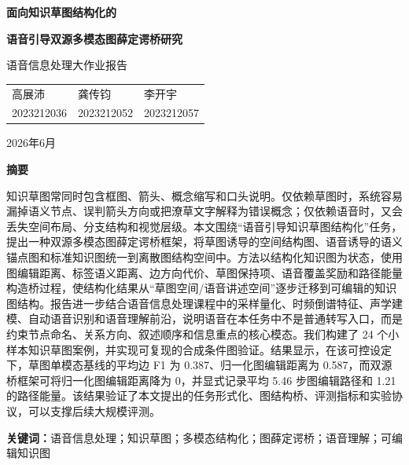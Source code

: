 \documentclass[UTF8,a4paper,12pt,fontset=fandol]{ctexart}
\begin{document}

\begin{titlepage}
  \centering
  \vspace*{2.2cm}
  {\LARGE\bfseries 面向知识草图结构化的\par}
  \vspace{0.35cm}
  {\LARGE\bfseries 语音引导双源多模态图薛定谔桥研究\par}
  \vspace{1.8cm}
  {\large 语音信息处理大作业报告\par}
  \vspace{2.0cm}
  \large
  \begin{tabular}{C{4.2cm}C{4.2cm}C{4.2cm}}
    高展沛 & 龚传钧 & 李开宇 \\
    2023212036 & 2023212052 & 2023212057
  \end{tabular}
  \vfill
  {\large 2026年6月\par}
\end{titlepage}

\clearpage
\begin{center}
  {\Large\bfseries 摘要}
\end{center}

知识草图常同时包含框图、箭头、概念缩写和口头说明。仅依赖草图时，系统容易漏掉语义节点、误判箭头方向或把潦草文字解释为错误概念；仅依赖语音时，又会丢失空间布局、分支结构和视觉层级。本文围绕“语音引导知识草图结构化”任务，提出一种双源多模态图薛定谔桥框架，将草图诱导的空间结构图、语音诱导的语义锚点图和标准知识图统一到离散图结构空间中。方法以结构化知识图为状态，使用图编辑距离、标签语义距离、边方向代价、草图保持项、语音覆盖奖励和路径能量构造桥过程，使结构化结果从“草图空间/语音讲述空间”逐步迁移到可编辑的知识图结构。报告进一步结合语音信息处理课程中的采样量化、时频倒谱特征、声学建模、自动语音识别和语音理解前沿，说明语音在本任务中不是普通转写入口，而是约束节点命名、关系方向、叙述顺序和信息重点的核心模态。我们构建了 24 个小样本知识草图案例，并实现可复现的合成条件图验证。结果显示，在该可控设定下，草图单模态基线的平均边 F1 为 0.387、归一化图编辑距离为 0.587，而双源桥框架可将归一化图编辑距离降为 0，并显式记录平均 5.46 步图编辑路径和 1.21 的路径能量。该结果验证了本文提出的任务形式化、图结构桥、评测指标和实验协议，可以支撑后续大规模评测。

\vspace{0.7cm}
\noindent\textbf{关键词：}语音信息处理；知识草图；多模态结构化；图薛定谔桥；语音理解；可编辑知识图

\clearpage
\tableofcontents
\clearpage
{}
\setcounter{page}{1}
\end{document}
